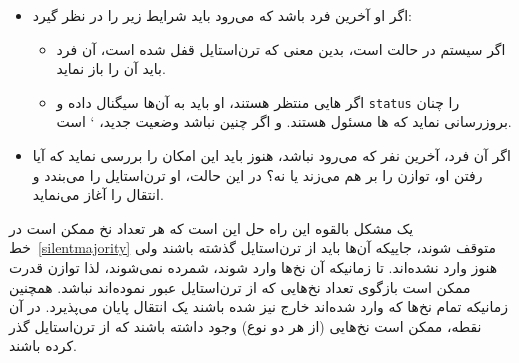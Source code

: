 \documentclass{book}
\begin{document}
\begin{itemize}

\item %
    اگر او آخرین فرد  باشد که می‌رود باید شرایط زیر را در نظر گیرد: 

    \begin{itemize}

    \item %
        اگر سیستم در حالت  است، بدین معنی که ترن‌استایل   قفل شده است، آن فرد باید آن را باز نماید. 

    \item %
    اگر هایی منتظر هستند، او باید به آن‌ها سیگنال داده و {\tt status}  را چنان بروزرسانی نماید که ها 
    مسئول هستند. و اگر چنین نباشد وضعیت جدید،       ` است. 

    \end{itemize}  

\item %
    اگر آن فرد، آخرین نفر   که می‌رود نباشد، هنوز باید این امکان را بررسی نماید که آیا رفتن او، توازن را بر هم می‌زند یا نه؟ 
    در این حالت، او ترن‌استایل  را می‌بندد و انتقال را آغاز می‌نماید. 

\end{itemize}

    

    
    یک مشکل بالقوه این راه حل این است که هر تعداد نخ‌ ممکن است در خط~\ref{silentmajority} متوقف شوند، جاییکه آن‌ها 
    باید از ترن‌استایل گذشته باشند ولی هنوز وارد نشده‌اند. تا زمانیکه آن‌ نخ‌ها وارد شوند، شمرده نمی‌شوند، لذا توازن قدرت ممکن است 
    بازگوی تعداد نخ‌هایی که از ترن‌استایل عبور نموده‌اند نباشد. همچنین زمانیکه تمام نخ‌ها که وارد شده‌اند خارج نیز شده باشند یک انتقال 
    پایان می‌پذیرد. در آن نقطه، ممکن است نخ‌هایی (از هر دو نوع) وجود داشته باشند که از ترن‌استایل گذر کرده باشند. 
    
\end{document}
